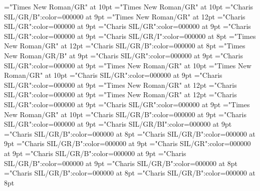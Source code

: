 \documentclass[gps1,twoside]{article}
\begin{document}
\pagestyle{plain}
\sloppy
\setlength{\parfillskip}{0pt plus 1fil}
\font\xitemte="Times New Roman/GR" at 10pt
\font\xitemhi="Times New Roman/GR" at 10pt
\font\xitemxitemcomplexformformbefore="Charis SIL/GR/B":color=000000 at 9pt
\font\xitemxitemcomplexformrefsbefore="Times New Roman/GR" at 12pt
\font\xitemxitemdefinitionbefore="Charis SIL/GR":color=000000 at 9pt
\font\xitemxitementryrefcomponentbefore="Charis SIL/GR":color=000000 at 9pt
\font\xitemxitementryreftypebefore="Charis SIL/GR":color=000000 at 9pt
\font\xitemxitemexamplebefore="Charis SIL/GR/I":color=000000 at 8pt
\font\xitemxitemexamplesbefore="Times New Roman/GR" at 12pt
\font\xitemxitemheadwordbefore="Charis SIL/GR/B":color=000000 at 8pt
\font\xitemxitemLexEntrypublishStemComponentTargetHeadWordRefbefore="Times New Roman/GR/B" at 9pt
\font\xitemxitemLexEntryTypepublishStemComplexFormTypeReverseAbbrPubbefore="Charis SIL/GR":color=000000 at 9pt
\font\xitemxitemLexEntryTypepublishStemEntryTypeAbbreviationPubbefore="Charis SIL/GR":color=000000 at 9pt
\font\xitemxitemLexSensepublishStemGlossPubLdbefore="Times New Roman/GR" at 10pt
\font\xitemxitemLexSensepublishStemGlossPubLebefore="Times New Roman/GR" at 10pt
\font\xitemxitempartofspeechbefore="Charis SIL/GR":color=000000 at 9pt
\font\xitemxitempictureLabelbefore="Charis SIL/GR":color=000000 at 9pt
\font\xitemxitemprimaryrefsbefore="Times New Roman/GR" at 12pt
\font\xitemxitempronunciationbefore="Charis SIL/GR":color=000000 at 9pt
\font\xitemxitempronunciationsbefore="Times New Roman/GR" at 12pt
\font\sensesensesensesbefore="Charis SIL/GR":color=000000 at 9pt
\font\xitemxitemtranslationbefore="Charis SIL/GR":color=000000 at 9pt
\font\xitemxitemtranslationLdbefore="Times New Roman/GR" at 10pt
\font\xitemxitemcrossrefbefore="Charis SIL/GR/B":color=000000 at 9pt
\font\xitemxitemcrossreftargetsbefore="Charis SIL/GR":color=000000 at 9pt
\font\xitemxitemcrossreftypebefore="Charis SIL/GR/BI":color=000000 at 9pt
\font\xitemxitemheadwordminorbefore="Charis SIL/GR/B":color=000000 at 8pt
\font\xitemxitemmainentryrefbefore="Charis SIL/GR/B":color=000000 at 9pt
\font\xitemxitemmainentryrefminorbefore="Charis SIL/GR/B":color=000000 at 9pt
\font\xitemxitempronunciationminorbefore="Charis SIL/GR":color=000000 at 9pt
\font\xitemxitemsensecrossrefbefore="Charis SIL/GR/B":color=000000 at 9pt
\font\xitemxitemsensemainentryrefbefore="Charis SIL/GR/B":color=000000 at 9pt
\font\xitemxitemheadwordsubbefore="Charis SIL/GR/B":color=000000 at 8pt
\font\xitemxitemLexEntrypublishRootMinorPrimaryTargetMLHeadWordPubbefore="Charis SIL/GR/B":color=000000 at 8pt
\font\xitemxitemLexEntrypublishStemMinorPrimaryTargetMLHeadWordPubbefore="Charis SIL/GR/B":color=000000 at 8pt
\end{document}
